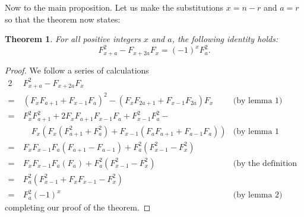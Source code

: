 \documentclass[12pt]{article}
\newtheorem{thm}{Theorem}[section]
\theoremstyle{definition}
\theoremstyle{remark}
\numberwithin{equation}{section}
\begin{document}
Now to the main proposition. Let us make the substitutions $x = n - r$
and $a=r$ so that the theorem now states:
\begin{thm}
For all positive integers $x$ and $a$, the following identity holds:
$$F_{x + a}^2 - F_{x + 2a}F_{x}=( - 1)^{x}F_{a}^2.$$
\end{thm}
\begin{proof}  We follow a series of calculations
\begin{alignat*}{2}
& F_{x + a}^2 - F_{x + 2a}F_{x} & \\ 
=\ & (F_{x}F_{a + 1} + F_{x - 1}F_{a})^2  - (F_{x}F_{2a + 1} + F_{x - 1}F_{2a})F_{x} & \text{(by lemma 1)} \\
=\ & F_{x}^2 F_{a + 1}^2 + 2F_{x} F_{a + 1} F_{x - 1} F_{a} + F_{x - 1}^2 F_{a}^2 - & \\ 
 & \quad F_{x}(F_{x}(F_{a + 1}^2 + F_{a}^2) + F_{x - 1}(F_{a} F_{a + 1} + F_{a - 1} F_{a})) & \text{(by lemma 1 again)} \\
=\ & F_{x}F_{x - 1}F_{a}(F_{a + 1} - F_{a - 1}) + F_{a}^2(F_{x - 1}^2 - F_{x}^2) & \\
=\ & F_{x}F_{x - 1}F_{a}(F_{a}) + F_{a}^2(F_{x - 1}^2 - F_{x}^2) & \text{(by the definition of Fibonacci numbers)} \\
=\ & F_{a}^2(F_{x - 1}^2 + F_{x}F_{x - 1} - F_{x}^2) & \\
=\ & F_{a}^2( - 1)^x & \text{(by lemma 2)} 
\end{alignat*}
completing our proof of the theorem.
\end{proof}
\end{document}
